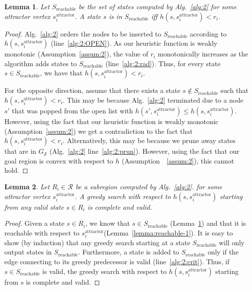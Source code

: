 \documentclass[letterpaper]{article} %
\newcommand{\calS}{\ensuremath{\mathcal{S}}\xspace}
\newcommand{\calR}{\ensuremath{\mathcal{R}}\xspace}
\newcommand{\sAttract}{\ensuremath{s^{\text{attractor}}_i}\xspace}
\newtheorem{lemma}{Lemma}
\begin{document}
\begin{lemma}
\label{lemma:reachable-2}
Let $S_{\text{reachable}}$ be the set of states computed by Alg.~\ref{alg:2} for some attractor vertex \sAttract.
%
A state $s$ is in $S_{\text{reachable}}$ iff $h(s, \sAttract) < r_i$.
\end{lemma}

\begin{proof}
Alg.~\ref{alg:2} orders the nodes to be inserted to $S_{\text{reachable}}$ according to $h(s, \sAttract)$ (line~\ref{alg:2:OPEN}).
As our heuristic function is weakly monotonic (Assumption~\ref{assum:2}), the value of $r_i$ monotonically increases as the algorithm adds states to $S_{\text{reachable}}$ (line~\ref{alg:2:rad}).
Thus, for every state $s \in S_{\text{reachable}}$, we have that $h(s, \sAttract) < r_i$.

For the opposite direction, assume that there exists a state $s \notin S_{\text{reachable}}$ such that $h(s, \sAttract) < r_i$.
This may be because  Alg.~\ref{alg:2} terminated due to a node $s'$ that was popped from the open list with 
$h(s', \sAttract) \leq h(s, \sAttract)$.
However, using the fact that our heuristic function is weakly monotonic (Assumption~\ref{assum:2}) we get a contradiction to the fact that $h(s, \sAttract) < r_i$.
Alternatively, this may be because we prune away states that are in $G_\calS$  (Alg.~\ref{alg:2} line~\ref{alg:2:prun}).
However, using the fact that our goal region is convex with respect to $h$ (Assumption~~\ref{assum:2}), this cannot hold.
\end{proof}

\begin{lemma}
\label{lemma:greedy}
Let $R_i \in \calR$ be a subregion computed by Alg.~\ref{alg:2}.
for some attractor vertex \sAttract.
% 
A greedy search with respect to $h(s, \sAttract)$  starting from any valid state $s \in R_i$ is complete and valid.
\end{lemma}

\begin{proof}
Given a state $s \in R_i$, we know that $s \in S_{\text{reachable}}$ (Lemma~\ref{lemma:reachable-2})
and that it is reachable with respect to \sAttract (Lemma~\ref{lemma:reachable-1}).
%
It is easy to show (by induction) that any greedy search starting at a state $S_{\text{reachable}}$ will only output states in $S_{\text{reachable}}$.
Furthermore, a state is added to $S_{\text{reachable}}$ only if the edge connecting to its greedy predecessor is valid (line~\ref{alg:2:crit}).
Thus, if $s\in S_{\text{reachable}}$ is valid, the greedy search with respect to $h(s, \sAttract)$  starting from $s$ is complete and valid.
\end{proof}
\end{document}
